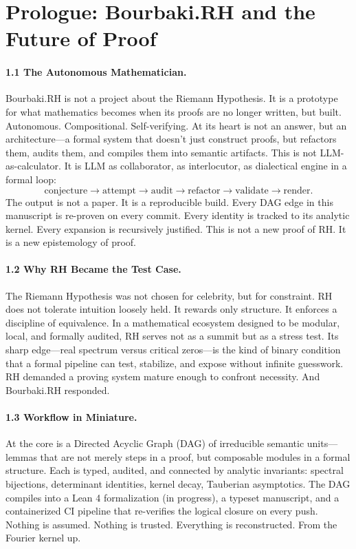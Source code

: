 \section*{Prologue: Bourbaki.RH and the Future of Proof}
\label{sec:prologue}

\paragraph*{1.1 The Autonomous Mathematician.}
Bourbaki.RH is not a project about the Riemann Hypothesis. It is a prototype for what mathematics becomes when its proofs are no longer written, but built. Autonomous. Compositional. Self-verifying. At its heart is not an answer, but an architecture—a formal system that doesn’t just construct proofs, but refactors them, audits them, and compiles them into semantic artifacts. This is not LLM-as-calculator. It is LLM as collaborator, as interlocutor, as dialectical engine in a formal loop:
\[
\text{conjecture} \rightarrow \text{attempt} \rightarrow \text{audit} \rightarrow \text{refactor} \rightarrow \text{validate} \rightarrow \text{render}.
\]
The output is not a paper. It is a reproducible build. Every DAG edge in this manuscript is re-proven on every commit. Every identity is tracked to its analytic kernel. Every expansion is recursively justified. This is not a new proof of RH. It is a new epistemology of proof.

\paragraph*{1.2 Why RH Became the Test Case.}
The Riemann Hypothesis was not chosen for celebrity, but for constraint. RH does not tolerate intuition loosely held. It rewards only structure. It enforces a discipline of equivalence. In a mathematical ecosystem designed to be modular, local, and formally audited, RH serves not as a summit but as a stress test. Its sharp edge—real spectrum versus critical zeros—is the kind of binary condition that a formal pipeline can test, stabilize, and expose without infinite guesswork. RH demanded a proving system mature enough to confront necessity. And Bourbaki.RH responded.

\paragraph*{1.3 Workflow in Miniature.}
At the core is a Directed Acyclic Graph (DAG) of irreducible semantic units—lemmas that are not merely steps in a proof, but composable modules in a formal structure. Each is typed, audited, and connected by analytic invariants: spectral bijections, determinant identities, kernel decay, Tauberian asymptotics. The DAG compiles into a Lean 4 formalization (in progress), a typeset manuscript, and a containerized CI pipeline that re-verifies the logical closure on every push. Nothing is assumed. Nothing is trusted. Everything is reconstructed. From the Fourier kernel up.

